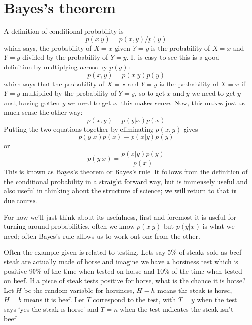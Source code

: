 \documentclass[12pt]{article}
\begin{document}
\section*{Bayes's theorem}

A definition of conditional probability is
\begin{equation}
  p(x|y)=p(x,y)/p(y)
\end{equation}
which says, the probability of $X=x$ given $Y=y$ is the probability of
$X=x$ and $Y=y$ divided by the probability of $Y=y$. It is easy to see
this is a good definition by multiplying across by $p(y)$:
\begin{equation}
p(x,y)=p(x|y)p(y)
\end{equation}
which says that the probability of $X=x$ and $Y=y$ is the probability
of $X=x$ if $Y=y$ multiplied by the probability of $Y=y$, so to get
$x$ and $y$ we need to get $y$ and, having gotten $y$ we need to get
$x$; this makes sense. Now, this makes just as much sense the other way:
\begin{equation}
p(x,y)=p(y|x)p(x)
\end{equation}
Putting the two equations together by eliminating $p(x,y)$ gives
\begin{equation}
  p(y|x)p(x)=p(x|y)p(y)
\end{equation}
or
\begin{equation}
  p(y|x)=\frac{p(x|y)p(y)}{p(x)}
\end{equation}
This is known as Bayes's theorem or Bayes's rule. It follows from the
definition of the conditional probability in a straight forward way,
but is immensely useful and also useful in thinking about the
structure of science; we will return to that in due course.

For now we'll just think about its usefulness, first and foremost it
is useful for turning around probabilities, often we know $p(x|y)$ but
$p(y|x)$ is what we need; often Bayes's rule allows us to work out one from the other.

Often the example given is related to testing. Lets say 5\% of steaks
sold as beef steak are actually made of horse and imagine we have a
horsiness test which is positive 90\% of the time when tested on horse
and 10\% of the time when tested on beef. If a piece of steak tests
positive for horse, what is the chance it is horse? Let $H$ be the
random variable for horsiness, $H=h$ means the steak is horse, $H=b$
means it is beef. Let $T$ correspond to the test, with $T=y$ when the test says `yes the steak is horse' and $T=n$ when the test indicates the steak isn't beef.
\end{document}
